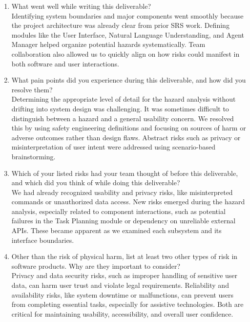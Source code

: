 \documentclass[12pt]{article}
\begin{document}
\begin{enumerate}
  \item What went well while writing this deliverable?\\
  Identifying system boundaries and major components went smoothly because
  the project architecture was already clear from prior SRS work. Defining
  modules like the User Interface, Natural Language Understanding, and Agent
  Manager helped organize potential hazards systematically. Team
  collaboration also allowed us to quickly align on how risks could manifest
  in both software and user interactions.

  \item What pain points did you experience during this deliverable, and how
  did you resolve them?\\
  Determining the appropriate level of detail for the hazard analysis
  without drifting into system design was challenging. It was sometimes
  difficult to distinguish between a hazard and a general usability concern.
  We resolved this by using safety engineering definitions and focusing on
  sources of harm or adverse outcomes rather than design flaws. Abstract
  risks such as privacy or misinterpretation of user intent were addressed
  using scenario-based brainstorming.

  \item Which of your listed risks had your team thought of before this
  deliverable, and which did you think of while doing this deliverable?\\
  We had already recognized usability and privacy risks, like
  misinterpreted commands or unauthorized data access. New risks emerged
  during the hazard analysis, especially related to component interactions,
  such as potential failures in the Task Planning module or dependency on
  unreliable external APIs. These became apparent as we examined each
  subsystem and its interface boundaries.

  \item Other than the risk of physical harm, list at least two other types
  of risk in software products. Why are they important to consider?\\
  Privacy and data security risks, such as improper handling of sensitive
  user data, can harm user trust and violate legal requirements.
  Reliability and availability risks, like system downtime or malfunctions,
  can prevent users from completing essential tasks, especially for
  assistive technologies. Both are critical for maintaining usability,
  accessibility, and overall user confidence.
\end{enumerate}
\end{document}
